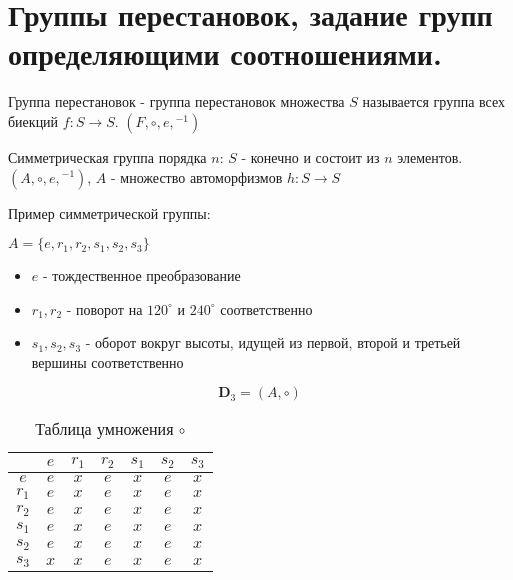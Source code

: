 \documentclass[../main/document.tex]{subfiles}
\begin{document}
\section{Группы перестановок, задание групп определяющими соотношениями.}
\begin{dfn}
Группа перестановок - группа перестановок множества $S$ называется группа всех биекций $f:S\rightarrow S$. $(F,\circ,e,{ }^{-1})$
\end{dfn}
\begin{exm}
\end{exm}
\begin{dfn}
Симметрическая группа порядка $n$: $S$ - конечно и состоит из $n$ элементов. $(A,\circ,e,{ }^{-1})$, $A$ - множество автоморфизмов $h:S\rightarrow S$
\end{dfn}
\begin{exm} \label{TriangleGroup}
Пример симметрической группы:


$A=\{e,r_1,r_2,s_1,s_2,s_3\}$
\begin{itemize}

  \item $e$ - тождественное преобразование
  \item $r_1, r_2$ - поворот на $120^{\circ}$ и $240^{\circ}$ соответственно
  \item $s_1, s_2, s_3$ - оборот вокруг высоты, идущей из первой, второй и третьей вершины соответственно
\end{itemize}

$$\mathbf{D}_3=(A,\circ)$$

\begin{table}[H]
\centering
\caption*{Таблица умножения $\circ$}
\renewcommand*{\arraystretch}{1.4}
\begin{tabular}{c|c|c|c|c|c|c}
  & $e$ & $r_1$ & $r_2$ & $s_1$& $s_2$ & $s_3$  \\ \hline
$e$ & $e$ & $x$ & $e$ & $x$& $e$ & $x$ \\ \hline
$r_1$ & $e$ & $x$ & $e$ & $x$& $e$ & $x$ \\ \hline
$r_2$ & $e$ & $x$ & $e$ & $x$& $e$ & $x$ \\ \hline
$s_1$ & $e$ & $x$ & $e$ & $x$& $e$ & $x$ \\ \hline
$s_2$ & $e$ & $x$ & $e$ & $x$& $e$ & $x$ \\ \hline
$s_3$ & $x$ & $x$& $e$ & $x$& $e$ & $x$ \\ 
\end{tabular}
\end{table}
\end{exm}

\begin{exm}

\end{exm}
\end{document}

